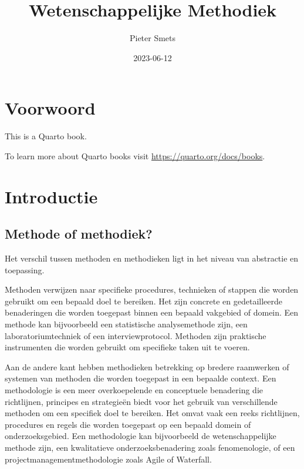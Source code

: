 \documentclass[
  letterpaper,
  DIV=11,
  numbers=noendperiod]{scrreprt}
\title{Wetenschappelijke Methodiek}
\author{Pieter Smets}
\date{2023-06-12}
\renewcommand*\contentsname{Inhoudsopgave}
\newcommand\contentsname{Inhoudsopgave}
\begin{document}
\maketitle
\ifdefined\Shaded\renewenvironment{Shaded}{\begin{tcolorbox}[interior hidden, frame hidden, boxrule=0pt, breakable, enhanced, sharp corners, borderline west={3pt}{0pt}{shadecolor}]}{\end{tcolorbox}}\fi

\renewcommand*\contentsname{Inhoudsopgave}
{
\hypersetup{linkcolor=}
\setcounter{tocdepth}{2}
\tableofcontents
}

\hypertarget{voorwoord}{%
\chapter*{Voorwoord}\label{voorwoord}}


This is a Quarto book.

To learn more about Quarto books visit
\url{https://quarto.org/docs/books}.


\hypertarget{introductie}{%
\chapter{Introductie}\label{introductie}}

\hypertarget{methode-of-methodiek}{%
\section{Methode of methodiek?}\label{methode-of-methodiek}}

Het verschil tussen methoden en methodieken ligt in het niveau van
abstractie en toepassing.

Methoden verwijzen naar specifieke procedures, technieken of stappen die
worden gebruikt om een bepaald doel te bereiken. Het zijn concrete en
gedetailleerde benaderingen die worden toegepast binnen een bepaald
vakgebied of domein. Een methode kan bijvoorbeeld een statistische
analysemethode zijn, een laboratoriumtechniek of een interviewprotocol.
Methoden zijn praktische instrumenten die worden gebruikt om specifieke
taken uit te voeren.

Aan de andere kant hebben methodieken betrekking op bredere raamwerken
of systemen van methoden die worden toegepast in een bepaalde context.
Een methodologie is een meer overkoepelende en conceptuele benadering
die richtlijnen, principes en strategieën biedt voor het gebruik van
verschillende methoden om een specifiek doel te bereiken. Het omvat vaak
een reeks richtlijnen, procedures en regels die worden toegepast op een
bepaald domein of onderzoeksgebied. Een methodologie kan bijvoorbeeld de
wetenschappelijke methode zijn, een kwalitatieve onderzoeksbenadering
zoals fenomenologie, of een projectmanagementmethodologie zoals Agile of
Waterfall.
\end{document}
